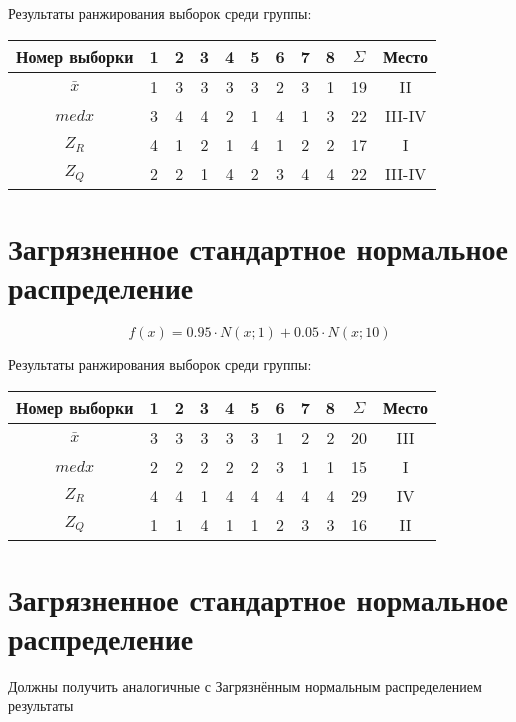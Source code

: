 \documentclass{article} %
\begin{document}
Результаты ранжирования выборок среди группы:
\begin{center}
	\begin{tabular}{|c| c|c|c|c|c|c|c|c| c|c|} \hline
		Номер выборки & 1 & 2 & 3 & 4 & 5 & 6 & 7 & 8 & \(\Sigma\) & Место \\ \hline
		\(\bar{x}\)   & 1 & 3 & 3 & 3 & 3 & 2 & 3 & 1 & 19 & II \\ \hline
		\(medx\)      & 3 & 4 & 4 & 2 & 1 & 4 & 1 & 3 & 22 & III-IV \\ \hline
		\(Z_R\)       & 4 & 1 & 2 & 1 & 4 & 1 & 2 & 2 & 17 & I \\ \hline
		\(Z_Q\)       & 2 & 2 & 1 & 4 & 2 & 3 & 4 & 4 & 22 & III-IV \\ \hline
	\end{tabular}
\end{center}

\section{Загрязненное стандартное нормальное распределение}
\[ f(x) = 0.95 \cdot N(x;1) + 0.05 \cdot N(x;10)\]

Результаты ранжирования выборок среди группы:
\begin{center}
	\begin{tabular}{|c| c|c|c|c|c|c|c|c| c|c|} \hline
		Номер выборки & 1 & 2 & 3 & 4 & 5 & 6 & 7 & 8 & \(\Sigma\) & Место \\ \hline
		\(\bar{x}\)   & 3 & 3 & 3 & 3 & 3 & 1 & 2 & 2 & 20 & III \\ \hline
		\(medx\)      & 2 & 2 & 2 & 2 & 2 & 3 & 1 & 1 & 15 & I \\ \hline
		\(Z_R\)       & 4 & 4 & 1 & 4 & 4 & 4 & 4 & 4 & 29 & IV \\ \hline
		\(Z_Q\)       & 1 & 1 & 4 & 1 & 1 & 2 & 3 & 3 & 16 & II \\ \hline
	\end{tabular}
\end{center}

\section{Загрязненное стандартное нормальное распределение}
Должны получить аналогичные с Загрязнённым нормальным распределением результаты
\end{document}
